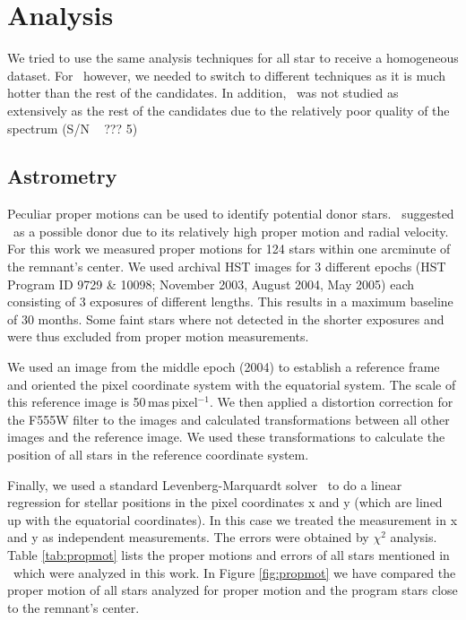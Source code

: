 \section{Analysis}
\label{sec:analysis}

We tried to use the same analysis techniques for all star to receive a homogeneous dataset. For \starb\, however, we needed to switch to different techniques as it is much hotter than the rest of the candidates. In addition, \stard\ was not studied as extensively as the rest of the candidates due to the relatively poor quality of the spectrum (S/N ~ ??? 5)




\subsection{Astrometry}
\label{sec:propmot}
Peculiar proper motions can be used to identify potential donor stars. \rl\ suggested \starg\ as a possible donor due to its relatively high proper motion and radial velocity. For this work we measured proper motions for 124 stars within one arcminute of the remnant's center. We used archival HST images for 3 different epochs (HST Program ID  9729 \& 10098; November 2003, August 2004, May 2005) each consisting of 3 exposures of different lengths. This results in a maximum baseline of 30 months. Some faint stars where not detected in the shorter exposures and were thus excluded from proper motion measurements.


We used an image from the middle epoch (2004) to establish a reference frame and oriented the pixel coordinate system with the equatorial system. The scale of this reference image is 50\,mas\,pixel$^{-1}$. We then applied a distortion correction for the F555W filter \citep{2006acs..rept....1A} to the images and calculated transformations between all other images and the reference image. We used these transformations to calculate the position of all stars in the reference coordinate system.


Finally, we used a standard Levenberg-Marquardt solver \citescipy\ to do a linear regression for stellar positions in the pixel coordinates x and y (which are lined up with the equatorial coordinates). In this case we treated the measurement in x and y as independent measurements. The errors were obtained by $\chi^2$ analysis. Table \ref{tab:propmot} lists the proper motions and errors of all stars mentioned in \rl\ which were analyzed in this work. In Figure \ref{fig:propmot} we have compared the proper motion of all stars analyzed for proper motion and the program stars close to the remnant's center.

